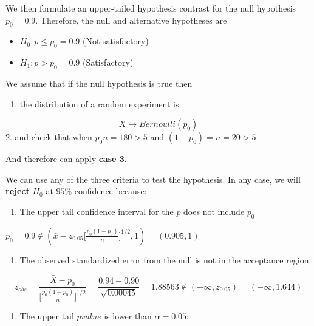 \documentclass[
]{book}
\providecommand{\tightlist}{%
  \setlength{\itemsep}{0pt}\setlength{\parskip}{0pt}}
\begin{document}
We then formulate an upper-tailed hypothesis contrast for the null hypothesis \(p_0=0.9\). Therefore, the null and alternative hypotheses are

\begin{itemize}
\tightlist
\item
  \(H_0: p \leq p_0=0.9\) (Not satisfactory)
\item
  \(H_1: p> p_0=0.9\) (Satisfactory)
\end{itemize}

We assume that if the null hypothesis is true then

\begin{enumerate}
\def\labelenumi{\arabic{enumi}.}
\tightlist
\item
  the distribution of a random experiment is
\end{enumerate}

\[X \rightarrow Bernoulli (p_0)\]
2. and check that when \(p_0n=180>5\) and \((1-p_0)=n=20>5\)

And therefore can apply \textbf{case 3}.

We can use any of the three criteria to test the hypothesis. In any case, we will \textbf{reject} \(H_0\) at \(95\%\) confidence because:

\begin{enumerate}
\def\labelenumi{\arabic{enumi}.}
\tightlist
\item
  The upper tail confidence interval for the \(p\) does not include \(p_0\)
\end{enumerate}

\(p_0=0.9 \notin (\bar{x}-z_{0.05}\big[\frac{p_0(1-p_0)}{n} \big]^{1/2},1)= (0.905,1)\)

\begin{enumerate}
\def\labelenumi{\arabic{enumi}.}
\setcounter{enumi}{1}
\tightlist
\item
  The observed standardized error from the null is not in the acceptance region
\end{enumerate}

\[z_{obs}= \frac{\bar{X}-p_0}{\big[\frac{p_0(1-p_0)}{n} \big]^{1/2}} =\frac{0.94-0.90}{\sqrt{0.00045}}=1.88563 \notin (-\infty, z_{0.05})=(-\infty, 1.644)\]

\begin{enumerate}
\def\labelenumi{\arabic{enumi}.}
\setcounter{enumi}{2}
\tightlist
\item
  The upper tail \(pvalue\) is lower than \(\alpha=0.05\):
\end{enumerate}
\end{document}
